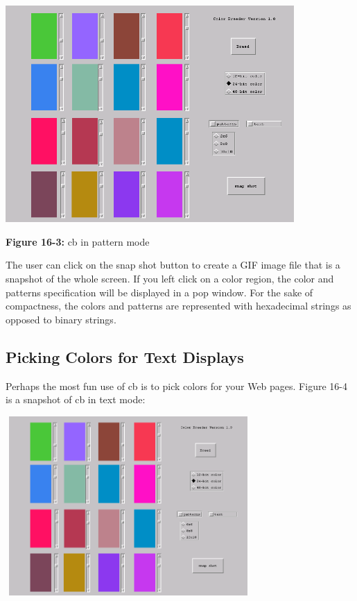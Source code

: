 \begin{center}
\includegraphics[width=4.3335in,height=3.252in]{ub-img/ub-img47.png}
\end{center}

{\sffamily\bfseries Figure 16-3:}
{\sffamily cb in pattern mode}

The user can click on the snap shot button to create a GIF image file
that is a snapshot of the whole screen. If you left click on a color
region, the color and patterns specification will be displayed in a pop
window. For the sake of compactness, the colors and patterns are
represented with hexadecimal strings as opposed to binary strings. 

\subsection{Picking Colors for Text Displays}
Perhaps the most fun use of \textsf{cb} is to pick colors for your Web
pages. Figure 16-4 is a snapshot of \textsf{cb} in text mode:

\bigskip

\begin{center}
\includegraphics[width=3.6811in,height=2.6929in]{ub-img/ub-img48.png}
\end{center}

